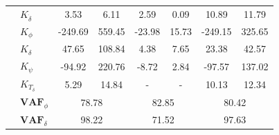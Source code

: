 \begin{table}[]
\begin{tabular}{llcccccc}
                                    & $K_{\dot{\delta}}$    & 3.53                                       & 6.11                                               & 2.59                                       & 0.09                                               & 10.89                                      & 11.79                                              \\
                                    & $K_{\phi} $           & -249.69                                    & 559.45                                             & -23.98                                     & 15.73                                              & -249.15                                    & 325.65                                             \\
                                    & $K_\delta $           & 47.65                                      & 108.84                                             & 4.38                                       & 7.65                                               & 23.38                                      & 42.57                                              \\
                                    & $K_\psi $             & -94.92                                     & 220.76                                             & -8.72                                      & 2.84                                               & -97.57                                     & 137.02                                             \\
                                    & $K_{T_\delta}$        & 5.29                                       & 14.84                                              & -                                          & -                                                  & 10.13                                      & 12.34                                              \\ \cline{2-8} 
                                    & $\mathbf{VAF}_\phi$   & \multicolumn{2}{c}{78.78}                                                                       & \multicolumn{2}{c}{82.85}                                                                       & \multicolumn{2}{c}{80.42}                                                                       \\
                                    & $\mathbf{VAF}_\delta$ & \multicolumn{2}{c}{98.22}                                                                       & \multicolumn{2}{c}{71.52}                                                                       & \multicolumn{2}{c}{97.63}                                                                       \\

\end{tabular}
\end{table}

